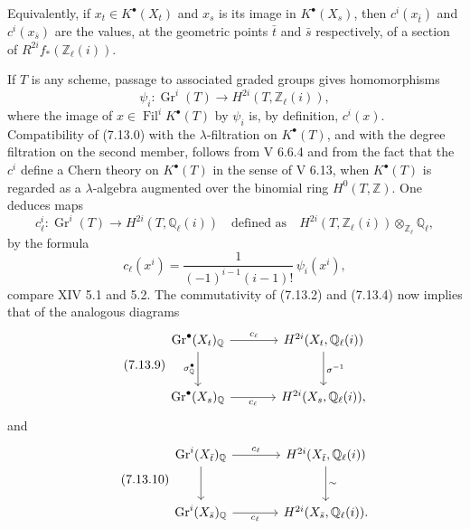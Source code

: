 \documentclass[11pt]{article}
\newcommand{\Gr}{\operatorname{Gr}}
\providecommand{\Gr}{\operatorname{Gr}}
\providecommand{\Gr}{\operatorname{G}}
\begin{document}
Equivalently, if \(x_t\in K^\bullet(X_t)\) and \(x_s\) is its image in \(K^\bullet(X_s)\), then \(c^i(x_{\bar t})\) and \(c^i(x_{\bar s})\) are the values, at the geometric points \(\bar t\) and \(\bar s\) respectively, of a section of \(R^{2i}f_*(\mathbb Z_\ell(i))\).

If \(T\) is any scheme, passage to associated graded groups gives homomorphisms
\[
  \psi_i:\Gr^i(T)\longrightarrow H^{2i}(T,\mathbb Z_\ell(i)),
\]
where the image of \(x\in \operatorname{Fil}^iK^\bullet(T)\) by \(\psi_i\) is, by definition, \(c^i(x)\). Compatibility of (7.13.0) with the \(\lambda\)-filtration on \(K^\bullet(T)\), and with the degree filtration on the second member, follows from V 6.6.4 and from the fact that the \(c^i\) define a Chern theory on \(K^\bullet(T)\) in the sense of V 6.13, when \(K^\bullet(T)\) is regarded as a \(\lambda\)-algebra augmented over the binomial ring \(H^0(T,\mathbb Z)\). One deduces maps
\begin{equation}\tag{7.13.7}
  c_\ell^i:\Gr^i(T)\longrightarrow
  H^{2i}(T,\mathbb Q_\ell(i))
  \quad\text{defined as}\quad
  H^{2i}(T,\mathbb Z_\ell(i))\otimes_{\mathbb Z_\ell}\mathbb Q_\ell,
\end{equation}
by the formula
\begin{equation}\tag{7.13.8}
  c_\ell(x^i)=\frac{1}{(-1)^{i-1}(i-1)!}\,\psi_i(x^i),
\end{equation}
compare XIV 5.1 and 5.2. The commutativity of (7.13.2) and (7.13.4) now implies that of the analogous diagrams
\begin{equation}\tag{7.13.9}
\begin{tikzcd}[column sep=large,row sep=large]
\Gr^\bullet(X_t)_{\mathbb Q} \arrow[r,"c_\ell"] \arrow[d,"\sigma_{\mathbb Q}^\bullet"'] &
H^{2i}(X_t,\mathbb Q_\ell(i)) \arrow[d,"\sigma^{-1}"]\\
\Gr^\bullet(X_s)_{\mathbb Q} \arrow[r,"c_\ell"'] &
H^{2i}(X_s,\mathbb Q_\ell(i)),
\end{tikzcd}
\end{equation}
and
\begin{equation}\tag{7.13.10}
\begin{tikzcd}[column sep=large,row sep=large]
\Gr^i(X_{\bar t})_{\mathbb Q} \arrow[r,"c_\ell"] \arrow[d] &
H^{2i}(X_{\bar t},\mathbb Q_\ell(i)) \arrow[d,"\sim"]\\
\Gr^i(X_{\bar s})_{\mathbb Q} \arrow[r,"c_\ell"'] &
H^{2i}(X_{\bar s},\mathbb Q_\ell(i)).
\end{tikzcd}
\end{equation}
\end{document}
